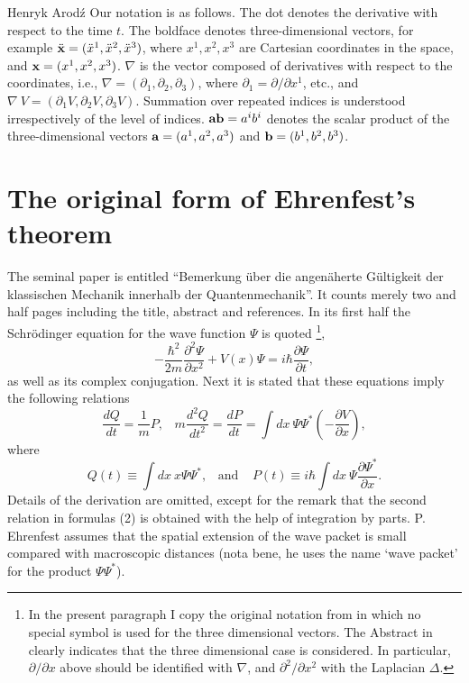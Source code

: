 \begin{artengenv}{Henryk Arod\'z}
Our notation is as follows. The dot denotes the derivative with respect to the time $t$. 
The boldface denotes three-dimensional vectors, for
example $\ddot{\bf{x}} = (\ddot{x}^1, \ddot{x}^2, \ddot{x}^3 )$, where $x^1, x^2, x^3 $ are Cartesian coordinates in the space, and ${\bf x} = (x^1, x^2, x^3)$. $\nabla$ is the vector composed of derivatives with respect to the coordinates, i.e., $\nabla = (\partial_1, \partial_2, \partial_3)$, where $\partial_1 = \partial/\partial x^1$, etc., and $\nabla \:V = (\partial_1 V, \partial_2 V, \partial_3 V).$ Summation over repeated indices is understood irrespectively of the level of indices. ${\bf a}{\bf b} = a^i b^i$ denotes the scalar product of the three-dimensional vectors ${\bf a}= (a^1, a^2, a^3)$ and $ {\bf b}= (b^1, b^2, b^3)$. 


\section{The original form of Ehrenfest's theorem}

The seminal paper \parencite{ehr} is entitled ``Bemerkung \"uber die angen\"aherte G\"ultigkeit der klassischen Mechanik innerhalb der Quantenmechanik''. It counts merely two and half pages including the title, abstract and references. In its first half the Schr\"odinger equation for the wave function $\Psi$ is quoted \footnote{In the present paragraph I copy the original notation from \parencite{ehr} in which no special symbol is used for the three dimensional vectors. The Abstract in \parencite{ehr} clearly indicates that the three dimensional case is considered. In particular, $\partial/ \partial x $ above should be identified with $\nabla$, and $\partial^2/ \partial x^2 $ with the Laplacian $\Delta$.}, 
\[ - \frac{\hbar^2}{2m} \frac{\partial^2 \Psi}{\partial x^2} + V(x) \Psi = i \hbar \frac{\partial \Psi}{\partial t}, \]
as well as its complex conjugation. 
 Next it is stated that these equations imply the following relations 
\begin{equation} \frac{d Q}{dt} = \frac{1}{m} P, \;\;\; m \frac{d^2 Q}{dt^2} = \frac{d P}{dt}= \int \! dx \:\Psi \Psi^* (- \frac{\partial V}{\partial x}), \end{equation}
where \[Q(t) \equiv \int\! dx \: x \Psi \Psi^*, \;\;\;\mbox{and} \;\;\;\; P(t) \equiv i \hbar \int \! dx \:\Psi \frac {\partial \Psi^* }{\partial x}. \]
Details of the derivation are omitted, except for the remark that the second relation in formulas (2) is obtained with the help of integration by parts. P. Ehrenfest assumes that the spatial extension of the wave packet is small compared with macroscopic distances 
(nota bene, he uses the name `wave packet' for the product $\Psi \Psi^*$). 


\end{artengenv}
